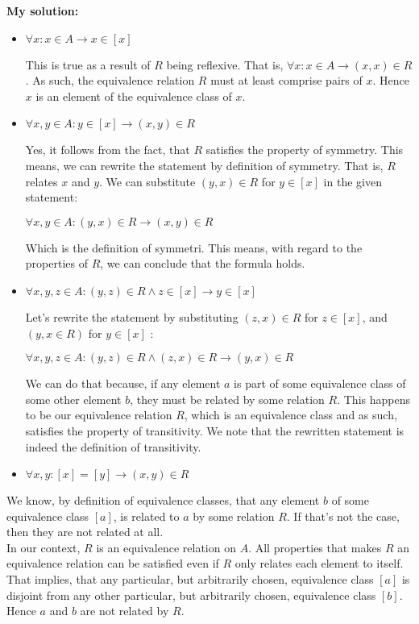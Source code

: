 \documentclass{report}
\newcommand{\cent}[1]{\begin{center}#1\end{center}}
\newcommand{\In}{\! \in \!}
\newcommand{\solution}{\textbf{My solution: }}
\begin{document}
	\solution
	\begin{itemize}
		\item $\forall x : x \In A \to x \In [x]$
		
		This is true as a result of $R$ being reflexive. That is, $\forall x : x \In A \to (x,x) \In R$. As such, the equivalence relation $R$ must at least comprise pairs of $x$. Hence $x$ is an element of the equivalence class of $x$.
		
		\item $\forall x,y \In A : y \In [x] \to (x,y) \In R$
		
		Yes, it follows from the fact, that $R$ satisfies the property of symmetry. This means, we can rewrite the statement by definition of symmetry. That is, $R$ relates $x$ and $y$. We can substitute $(y,x)\In R$ for $y \In [x]$ in the given statement:
		
		\cent{$\forall x,y \In A : (y,x) \In R \to (x,y) \In R$}
		
		Which is the definition of symmetri. This means, with regard to the properties of $R$, we can conclude that the formula holds.
		
		\item $\forall x,y,z \In A : (y,z) \In R \wedge z \In [x] \to y \In [x]$
		
		Let's rewrite the statement by substituting $(z,x)\In R$ for $z \In [x]$, and $(y,x \In R)$ for $y \In [x]$ :
		
		\cent{$\forall x,y,z \In A : (y,z) \In R \wedge (z,x)\In R \to (y,x) \In R$}
		
		We can do that because, if any element $a$ is part of some equivalence class of some other element $b$, they must be related by some relation $R$. This happens to be our equivalence relation $R$, which is an equivalence class and as such, satisfies the property of transitivity. We note that the rewritten statement is indeed the definition of transitivity.
		
		\item $\forall x,y : [x] = [y] \to (x,y)\In R$
	\end{itemize}
		
	We know, by definition of equivalence classes, that any element $b$ of some equivalence class $[a]$, is related to $a$ by some relation $R$. If that's not the case, then they are not related at all.\\ 
	
	In our context, $R$ is an equivalence relation on $A$. All properties that makes $R$ an equivalence relation can be satisfied even if $R$ only relates each element to itself. That implies, that any particular, but arbitrarily chosen, equivalence class $[a]$ is disjoint from any other particular, but arbitrarily chosen, equivalence class $[b]$. Hence $a$ and $b$ are not related by $R$.\\
	
\end{document}
